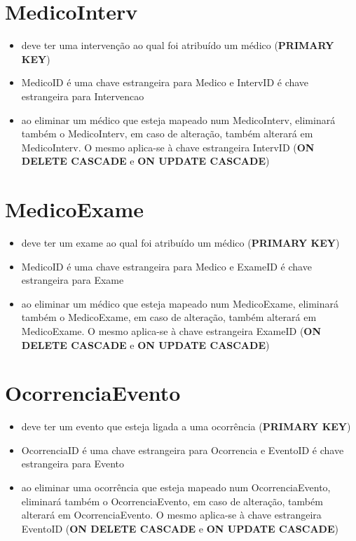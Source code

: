 \documentclass[article, a4paper, 12pt, oneside]{memoir}
\begin{document}
\section*{MedicoInterv}
\begin{itemize}
	\item deve ter uma intervenção ao qual foi atribuído um médico (\textbf{PRIMARY KEY})
	\item MedicoID é uma chave estrangeira para Medico e IntervID é chave estrangeira para Intervencao
	\item ao eliminar um médico que esteja mapeado num MedicoInterv, eliminará também o MedicoInterv, em caso de alteração, também alterará em MedicoInterv. O mesmo aplica-se à chave estrangeira IntervID (\textbf{ON DELETE CASCADE} e \textbf{ON UPDATE CASCADE})
\end{itemize}

\section*{MedicoExame}
\begin{itemize}
	\item deve ter um exame ao qual foi atribuído um médico (\textbf{PRIMARY KEY})
	\item MedicoID é uma chave estrangeira para Medico e ExameID é chave estrangeira para Exame
	\item ao eliminar um médico que esteja mapeado num MedicoExame, eliminará também o MedicoExame, em caso de alteração, também alterará em MedicoExame. O mesmo aplica-se à chave estrangeira ExameID (\textbf{ON DELETE CASCADE} e \textbf{ON UPDATE CASCADE})
\end{itemize}

\section*{OcorrenciaEvento}
\begin{itemize}
	\item deve ter um evento que esteja ligada a uma ocorrência (\textbf{PRIMARY KEY})
	\item OcorrenciaID é uma chave estrangeira para Ocorrencia e EventoID é chave estrangeira para Evento
	\item ao eliminar uma ocorrência que esteja mapeado num OcorrenciaEvento, eliminará também o OcorrenciaEvento, em caso de alteração, também alterará em OcorrenciaEvento. O mesmo aplica-se à chave estrangeira EventoID (\textbf{ON DELETE CASCADE} e \textbf{ON UPDATE CASCADE})
\end{itemize}
\end{document}

